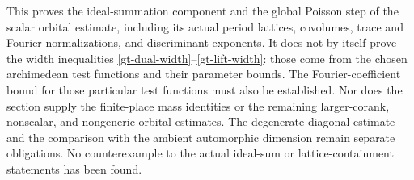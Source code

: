 This proves the ideal-summation component and the global Poisson
step of the scalar orbital estimate, including its actual period
lattices, covolumes, trace and Fourier normalizations, and
discriminant exponents.  It does not by itself prove the width
inequalities \eqref{gt-dual-width}--\eqref{gt-lift-width}: those
come from the chosen archimedean test functions and their parameter
bounds.  The Fourier-coefficient bound for those particular
test functions must also be established.  Nor does the section
supply the finite-place mass identities or the remaining
larger-corank, nonscalar, and nongeneric orbital estimates.  The
degenerate diagonal estimate and the comparison with the ambient
automorphic dimension remain separate obligations.  No
counterexample to the actual ideal-sum or lattice-containment
statements has been found.


